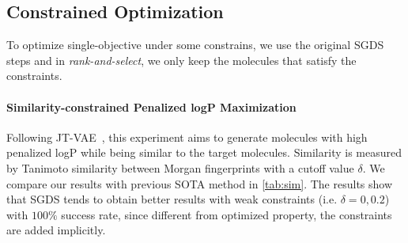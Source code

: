 \documentclass[accepted]{uai2023} %
\begin{document}
\subsection{Constrained Optimization}
To optimize single-objective under some constrains, we use the original SGDS steps and in \textit{rank-and-select}, we only keep the molecules that satisfy the constraints.
\label{sec:constrained}
\paragraph{Similarity-constrained Penalized logP Maximization}
Following JT-VAE~\citep{jin2018junction}, this experiment aims to generate molecules with high penalized logP while being similar to the target molecules. Similarity is measured by Tanimoto similarity
between Morgan fingerprints with a cutoff value $\delta$. We compare our results with previous SOTA method in \cref{tab:sim}. The results show that SGDS tends to obtain better results with weak constraints (i.e. $\delta=0, 0.2$) with $100\%$ success rate, since different from optimized property, the constraints are added implicitly.


\begin{table}[h]
\caption{Similarity-constrained optimization results. LIMO results obtained from~\citep{eckmann2022limo,luo2021graphdf}.}
\label{tab:sim}
\centering
{}
\end{table}
\end{document}
